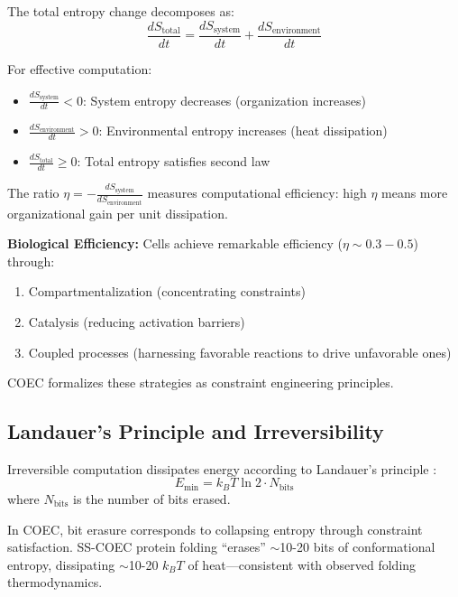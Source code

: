 \documentclass[11pt]{article}
\begin{document}
The total entropy change decomposes as:
\begin{equation}
\frac{dS_{\text{total}}}{dt} = \frac{dS_{\text{system}}}{dt} + \frac{dS_{\text{environment}}}{dt}
\end{equation}

For effective computation:
\begin{itemize}
\item $\frac{dS_{\text{system}}}{dt} < 0$: System entropy decreases (organization increases)
\item $\frac{dS_{\text{environment}}}{dt} > 0$: Environmental entropy increases (heat dissipation)
\item $\frac{dS_{\text{total}}}{dt} \geq 0$: Total entropy satisfies second law
\end{itemize}

The ratio $\eta = -\frac{dS_{\text{system}}}{dS_{\text{environment}}}$ measures computational efficiency: high $\eta$ means more organizational gain per unit dissipation.

\textbf{Biological Efficiency:} Cells achieve remarkable efficiency ($\eta \sim 0.3-0.5$) through:
\begin{enumerate}
\item Compartmentalization (concentrating constraints)
\item Catalysis (reducing activation barriers)
\item Coupled processes (harnessing favorable reactions to drive unfavorable ones)
\end{enumerate}

COEC formalizes these strategies as constraint engineering principles.

\subsection{Landauer's Principle and Irreversibility}

Irreversible computation dissipates energy according to Landauer's principle \citep{landauer1961irreversibility}:
\begin{equation}
E_{\text{min}} = k_B T \ln 2 \cdot N_{\text{bits}}
\end{equation}
where $N_{\text{bits}}$ is the number of bits erased.

In COEC, bit erasure corresponds to collapsing entropy through constraint satisfaction. SS-COEC protein folding ``erases'' $\sim$10-20 bits of conformational entropy, dissipating $\sim$10-20 $k_B T$ of heat—consistent with observed folding thermodynamics.
\end{document}

